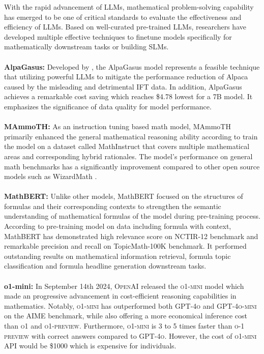 \documentclass[10pt]{article}
\begin{document}
 
With the rapid advancement of LLMs, mathematical problem-solving capability has emerged to be one of critical standards to evaluate the effectiveness and efficiency of LLMs. Based on well-curated pre-trained LLMs, researchers have developed multiple effective techniques to finetune models specifically for mathematically downstream tasks or building SLMs.\\
\\
\textbf{AlpaGasus:} Developed by \cite{Chen2023AlpaGasusTA}, the AlpaGasus model represents a feasible technique that utilizing powerful LLMs to mitigate the performance reduction of Alpaca \cite{alpaca} caused by the misleading and detrimental IFT data. In addition, AlpaGasus achieves a remarkable cost saving which reaches \$4.78 lowest for a 7B model. It emphasizes the significance of data quality for model performance.
\\
\\
\textbf{MAmmoTH:} As an instruction tuning based math model, MAmmoTH \cite{Yue2023MAmmoTHBM} primarily enhanced the general mathematical reasoning ability according to train the model on a dataset called MathInstruct that covers multiple mathematical areas and corresponding hybrid rationales. The model's performance on general math benchmarks \cite{hendrycksmath2021, Cobbe2021TrainingVT,Ling2017ProgramIB} has a significantly improvement compared to other open source models such as WizardMath  \cite{luo2023wizardmathempoweringmathematicalreasoning}. 
\\
\\
\textbf{MathBERT:} Unlike other models, MathBERT \cite{Peng2021MathBERTAP} focused on the structures of formulas and their corresponding contexts to strengthen the semantic understanding of mathematical formulas of the model during pre-training process. According to pre-training model on data including formula with context, MathBERT has demonstrated high relevance score on NCTIR-12 \cite{Zanibbi2016NTCIR12MT} benchmark and remarkable precision and recall on TopicMath-100K \cite{Peng2021MathBERTAP} benchmark. It performed outstanding results on mathematical information retrieval, formula topic classification and formula headline generation downstream tasks.
\\
\\
\textbf{o1-mini:} In September 14th 2024, \textsc{OpenAI} released the \textsc{o1-mini} model \cite{openai2024o1mini} which made an progressive advancement in cost-efficient reasoning capabilities in mathematics. Notably, \textsc{o1-mini} has outperformed both \textsc{GPT-4o} and \textsc{GPT-4o-mini} on the AIME benchmark, while also offering a more economical inference cost than \textsc{o1} and \textsc{o1-preview}.  Furthermore, \textsc{o1-mini} is 3 to 5 times faster than \textsc{o-1 preview} with correct answers compared to \textsc{GPT-4o}. However, the cost of \textsc{o1-mini API} would be \$1000 which is expensive for individuals.   
\end{document}
